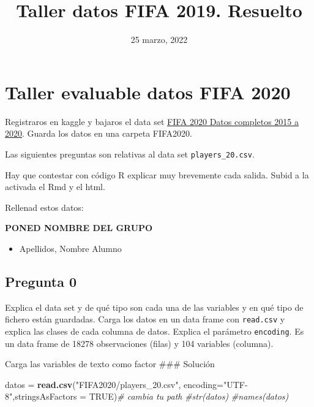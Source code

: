 \documentclass[]{article}
\title{Taller datos FIFA 2019. Resuelto}
\author{}
\date{\vspace{-2.5em}25 marzo, 2022}
\newenvironment{Shaded}{\begin{snugshade}}{\end{snugshade}}
\newcommand{\CommentTok}[1]{\textcolor[rgb]{0.56,0.35,0.01}{\textit{#1}}}
\newcommand{\DataTypeTok}[1]{\textcolor[rgb]{0.13,0.29,0.53}{#1}}
\newcommand{\KeywordTok}[1]{\textcolor[rgb]{0.13,0.29,0.53}{\textbf{#1}}}
\newcommand{\NormalTok}[1]{#1}
\newcommand{\OtherTok}[1]{\textcolor[rgb]{0.56,0.35,0.01}{#1}}
\newcommand{\StringTok}[1]{\textcolor[rgb]{0.31,0.60,0.02}{#1}}
\providecommand{\tightlist}{%
  \setlength{\itemsep}{0pt}\setlength{\parskip}{0pt}}
\begin{document}
\maketitle

{
\hypersetup{linkcolor=blue}
\setcounter{tocdepth}{2}
\tableofcontents
}
\hypertarget{taller-evaluable-datos-fifa-2020}{%
\section{Taller evaluable datos FIFA
2020}\label{taller-evaluable-datos-fifa-2020}}

Registraros en kaggle y bajaros el data set
\href{https://www.kaggle.com/stefanoleone992/fifa-20-complete-player-dataset}{FIFA
2020 Datos completos 2015 a 2020}. Guarda los datos en una carpeta
FIFA2020.

Las siguientes preguntas son relativas al data set
\texttt{players\_20.csv}.

Hay que contestar con código R explicar muy brevemente cada salida.
Subid a la activada el Rmd y el html.

Rellenad estos datos:

\textbf{PONED NOMBRE DEL GRUPO}

\begin{itemize}
\tightlist
\item
  Apellidos, Nombre Alumno
\end{itemize}

\hypertarget{pregunta-0}{%
\subsection{Pregunta 0}\label{pregunta-0}}

Explica el data set y de qué tipo son cada una de las variables y en qué
tipo de fichero están guardadas. Carga los datos en un data frame con
\texttt{read.csv} y explica las clases de cada columna de datos. Explica
el parámetro \texttt{encoding}. Es un data frame de 18278 observaciones
(filas) y 104 variables (columna).

Carga las variables de texto como factor \#\#\# Solución

\begin{Shaded}
\begin{Highlighting}[]
\NormalTok{datos =}\StringTok{ }\KeywordTok{read.csv}\NormalTok{(}\StringTok{"FIFA2020/players_20.csv"}\NormalTok{,}
  \DataTypeTok{encoding=}\StringTok{"UTF-8"}\NormalTok{,}\DataTypeTok{stringsAsFactors =} \OtherTok{TRUE}\NormalTok{)}\CommentTok{# cambia tu path}
\CommentTok{#str(datos)}
\CommentTok{#names(datos)}
\end{Highlighting}
\end{Shaded}
\end{document}
